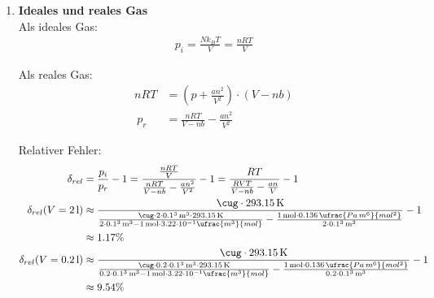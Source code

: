 \documentclass[11pt,letterpaper]{article}
\begin{document}

\begin{enumerate}
    \item \textbf{Ideales und reales Gas}\,\\[1ex]
        Als ideales Gas:
        \begin{align*}
            p_{i}= \frac{N k_B T}{V}
            = \frac{n R T}{V}
        \end{align*}
        
        Als reales Gas:
        \begin{align*}
            n R T &= \left(p+\frac{a n^2}{V^2}\right) \cdot(V-n b)\\\
            p_r &= \frac{n R T}{V-n b} - \frac{a n^2}{V^2}
        \end{align*}

        Relativer Fehler:
        \begin{align*}
            \delta_{rel} &= \frac{p_i}{p_r} - 1
            = \frac{\frac{n R T}{V}}{\frac{n R T}{V-n b} - \frac{a n^2}{V^2}} - 1
            = \frac{R T}{\frac{R V T}{V-n b} - \frac{a n}{V}} - 1\\
            \delta_{rel}(V=2\,\mathrm{l})&\approx \frac{\cug \cdot 293.15\,\mathrm{K}}{\frac{\cug \cdot 2\cdot0.1^3\,\mathrm{m^3} \cdot 293.15\,\mathrm{K}}{2\cdot0.1^3\,\mathrm{m^3}-1\,\mathrm{mol}\cdot 3.22\cdot 10^{-1}\ufrac{m^3}{mol}} - \frac{1\,\mathrm{mol}\cdot 0.136\,\ufrac{Pa\,m^6}{mol^2}}{2\cdot0.1^3\,\mathrm{m^3}}} - 1\\
            &\approx 1.17\%\\
            \delta_{rel}(V=0.2\,\mathrm{l})&\approx \frac{\cug \cdot 293.15\,\mathrm{K}}{\frac{\cug \cdot 0.2\cdot0.1^3\,\mathrm{m^3} \cdot 293.15\,\mathrm{K}}{0.2\cdot0.1^3\,\mathrm{m^3}-1\,\mathrm{mol}\cdot 3.22\cdot 10^{-1}\ufrac{m^3}{mol}} - \frac{1\,\mathrm{mol}\cdot 0.136\,\ufrac{Pa\,m^6}{mol^2}}{0.2\cdot0.1^3\,\mathrm{m^3}}} - 1\\
            &\approx 9.54\%
        \end{align*}
    

\end{enumerate}
\end{document}
